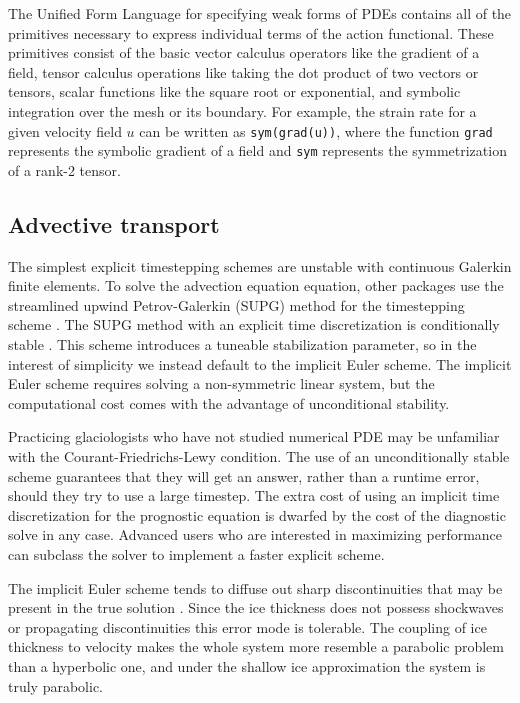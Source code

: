\documentclass[journal abbreviation, manuscript]{copernicus}
\begin{document}
The Unified Form Language for specifying weak forms of PDEs contains all of the primitives necessary to express individual terms of the action functional.
These primitives consist of the basic vector calculus operators like the gradient of a field, tensor calculus operations like taking the dot product of two vectors or tensors, scalar functions like the square root or exponential, and symbolic integration over the mesh or its boundary.
For example, the strain rate for a given velocity field $u$ can be written as \texttt{sym(grad(u))}, where the function \texttt{grad} represents the symbolic gradient of a field and \texttt{sym} represents the symmetrization of a rank-2 tensor.


\subsection{Advective transport} \label{sec:prognostic-model}

The simplest explicit timestepping schemes are unstable with continuous Galerkin finite elements.
To solve the advection equation equation, other packages use the streamlined upwind Petrov-Galerkin (SUPG) method for the timestepping scheme \citep{brinkerhoff2013data, larour2012continental}.
The SUPG method with an explicit time discretization is conditionally stable \citep{donea2003finite}.
This scheme introduces a tuneable stabilization parameter, so in the interest of simplicity we instead default to the implicit Euler scheme.
The implicit Euler scheme requires solving a non-symmetric linear system, but the computational cost comes with the advantage of unconditional stability.

Practicing glaciologists who have not studied numerical PDE may be unfamiliar with the Courant-Friedrichs-Lewy condition.
The use of an unconditionally stable scheme guarantees that they will get an answer, rather than a runtime error, should they try to use a large timestep.
The extra cost of using an implicit time discretization for the prognostic equation is dwarfed by the cost of the diagnostic solve in any case.
Advanced users who are interested in maximizing performance can subclass the solver to implement a faster explicit scheme.

The implicit Euler scheme tends to diffuse out sharp discontinuities that may be present in the true solution \citep{donea2003finite}.
Since the ice thickness does not possess shockwaves or propagating discontinuities this error mode is tolerable.
The coupling of ice thickness to velocity makes the whole system more resemble a parabolic problem than a hyperbolic one, and under the shallow ice approximation the system is truly parabolic.
\end{document}
